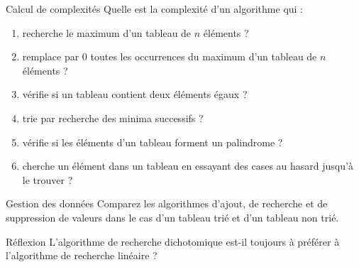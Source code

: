 			\begin{Exercice}{Calcul de complexités}
				Quelle est la complexité d'un algorithme qui :		
				\begin{enumerate}[label=\alph*)]
				\item 
					recherche le maximum d'un tableau de $n$ éléments ?
				\item 
					remplace par 0 toutes les occurrences du maximum 
					d'un tableau de $n$ éléments ?
				\item 
					vérifie si un tableau contient deux éléments égaux ?
				\item 
					trie par recherche des minima successifs ?
				\item 
					vérifie si les éléments d'un tableau forment un palindrome ?
				\item
					cherche un élément dans un tableau 
					en essayant des cases au hasard jusqu'à le trouver ?
				\end{enumerate}
			\end{Exercice}

			\begin{Exercice}{Gestion des données}
				Comparez les algorithmes d'ajout, 
				de recherche et de suppression
				de valeurs dans le cas d'un tableau trié
				et d'un tableau non trié.
			\end{Exercice}
			
			\begin{Exercice}{Réflexion}
				L’algorithme de recherche dichotomique 
				est-il toujours à préférer à
				l’algorithme de recherche linéaire ?
			\end{Exercice}
	
